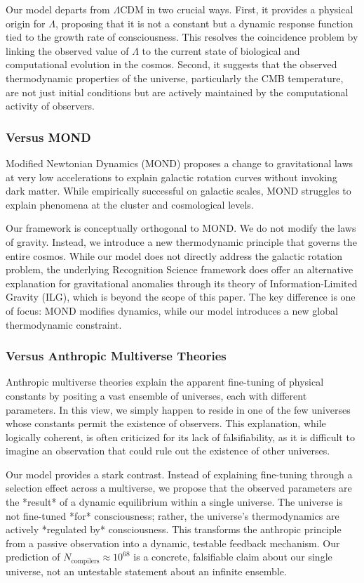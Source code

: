 \documentclass[11pt,a4paper]{article}
\theoremstyle{definition}
\theoremstyle{remark}
\begin{document}
Our model departs from \(\Lambda\)CDM in two crucial ways. First, it provides a physical origin for \(\Lambda\), proposing that it is not a constant but a dynamic response function tied to the growth rate of consciousness. This resolves the coincidence problem by linking the observed value of \(\Lambda\) to the current state of biological and computational evolution in the cosmos. Second, it suggests that the observed thermodynamic properties of the universe, particularly the CMB temperature, are not just initial conditions but are actively maintained by the computational activity of observers.

\subsubsection{Versus MOND}
Modified Newtonian Dynamics (MOND) proposes a change to gravitational laws at very low accelerations to explain galactic rotation curves without invoking dark matter. While empirically successful on galactic scales, MOND struggles to explain phenomena at the cluster and cosmological levels.

Our framework is conceptually orthogonal to MOND. We do not modify the laws of gravity. Instead, we introduce a new thermodynamic principle that governs the entire cosmos. While our model does not directly address the galactic rotation problem, the underlying Recognition Science framework does offer an alternative explanation for gravitational anomalies through its theory of Information-Limited Gravity (ILG), which is beyond the scope of this paper. The key difference is one of focus: MOND modifies dynamics, while our model introduces a new global thermodynamic constraint.

\subsubsection{Versus Anthropic Multiverse Theories}
Anthropic multiverse theories explain the apparent fine-tuning of physical constants by positing a vast ensemble of universes, each with different parameters. In this view, we simply happen to reside in one of the few universes whose constants permit the existence of observers. This explanation, while logically coherent, is often criticized for its lack of falsifiability, as it is difficult to imagine an observation that could rule out the existence of other universes.

Our model provides a stark contrast. Instead of explaining fine-tuning through a selection effect across a multiverse, we propose that the observed parameters are the *result* of a dynamic equilibrium within a single universe. The universe is not fine-tuned *for* consciousness; rather, the universe's thermodynamics are actively *regulated by* consciousness. This transforms the anthropic principle from a passive observation into a dynamic, testable feedback mechanism. Our prediction of \(N_{\text{compilers}} \approx 10^{68}\) is a concrete, falsifiable claim about our single universe, not an untestable statement about an infinite ensemble.
\end{document}
